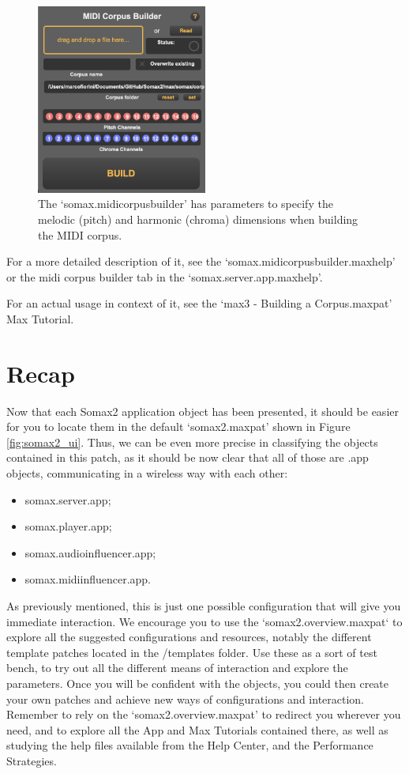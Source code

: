  \begin{figure}[H]
    \centering        
 	\includegraphics[width=0.5\textwidth, keepaspectratio]{img/midicorpusbuilder.png}
    \caption{The `somax.midicorpusbuilder' has parameters to specify the melodic (pitch) and harmonic (chroma) dimensions when building the MIDI corpus.}
    \label{fig:midicorpusbuilder}
\end{figure}

For a more detailed description of it, see the `somax.midicorpusbuilder.maxhelp' or the midi corpus builder tab in the `somax.server.app.maxhelp'.

For an actual usage in context of it, see the `max3 - Building a Corpus.maxpat' Max Tutorial.

\section{Recap}

Now that each Somax2 application object has been presented, it should be easier for you to locate them in the default `somax2.maxpat' shown in Figure \ref{fig:somax2_ui}. 
Thus, we can be even more precise in classifying the objects contained in this patch, as it should be now clear that all of those are .app objects, communicating in a wireless way with each other:

\begin{itemize}
    \item somax.server.app;
    \item somax.player.app;
    \item somax.audioinfluencer.app;
    \item somax.midiinfluencer.app.
\end{itemize}

\noindent As previously mentioned, this is just one possible configuration that will give you immediate interaction. We encourage you to use the `somax2.overview.maxpat` to explore all the suggested configurations and resources, notably the different template patches located in the /templates folder. Use these as a sort of test bench, to try out all the different means of interaction and explore the parameters. Once you will be confident with the objects, you could then create your own patches and achieve new ways of configurations and interaction.
Remember to rely on the `somax2.overview.maxpat' to redirect you wherever you need, and to explore all the App and Max Tutorials contained there, as well as studying the help files available from the Help Center, and the Performance Strategies.

